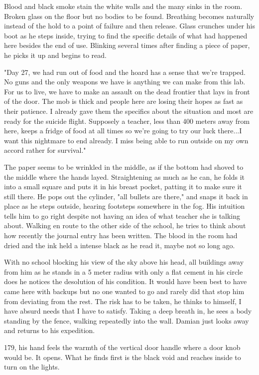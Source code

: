 \begin{Document}
        Blood and black smoke stain the white walls and the many sinks in the room. Broken glass on the floor but no bodies to be found. Breathing becomes 
    naturally instead of the hold to a point of failure and then release. Glass crunches under his boot as he steps inside, trying to find the specific details
    of what had happened here besides the end of use. Blinking several times after finding a piece of paper, he picks it up and begins to read.

        "Day 27, we had run out of food and the hoard has a sense that we're trapped. No guns and the only weapons we have is anything we can make from this lab.
    For us to live, we have to make an assault on the dead frontier that lays in front of the door. The mob is thick and people here are losing their hopes as
    fast as their patience. I already gave them the specifics about the situation and most are ready for the suicide flight. Supposely a teacher, less than 
    400 meters away from here, keeps a fridge of food at all times so we're going to try our luck there...I want this nightmare to end already. I miss being
    able to run outside on my own accord rather for survival."

        The paper seems to be wrinkled in the middle, as if the bottom had shoved to the middle where the hands layed.  Straightening as much as he can, he folds
    it into a small square and puts it in his breast pocket, patting it to make sure it still there. He pops out the cylinder, "all bullets are there," and snaps
    it back in place as he steps outside, hearing footsteps somewhere in the fog. His intuition tells him to go right despite not having an idea of what teacher
    she is talking about. Walking en route to the other side of the school, he tries to think about how recently the journal entry has been written. The blood in
    the room had dried and the ink held a intense black as he read it, maybe not so long ago.

        With no school blocking his view of the sky above his head, all buildings away from him as he stands in a 5 meter radius with only a flat cement in his
    circle does he notices the desolution of his condition. It would have been best to have came here with backups but no one wanted to go and rarely did that
    stop him from deviating from the rest. The risk has to be taken, he thinks to himself, I have absurd needs that I have to satisfy. Taking a deep breath in,
    he sees a body standing by the fence, walking repeatedly into the wall. Damian just looks away and returns to his expedition.

        179, his hand feels the warmth of the vertical door handle where a door knob would be. It opens. What he finds first is the black void and reaches inside
    to turn on the lights.
\end{Document}

